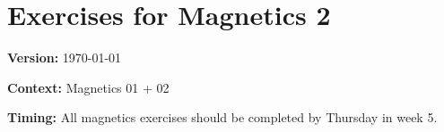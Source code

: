 \documentclass[a4paper,12pt]{article}
\begin{document}

\setcounter{section}{3}
  \section{Exercises for Magnetics 2}
  \textbf{Version:} \today 
  
  \textbf{Context:} Magnetics 01 + 02
  
  \textbf{Timing:} All magnetics exercises should be completed by Thursday in week 5.
  
    
    
    
\end{document}
